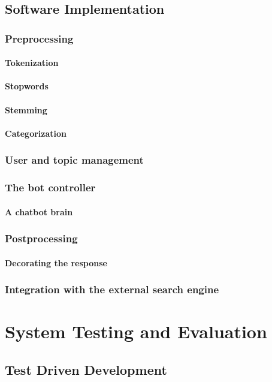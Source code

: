 \documentclass[12pt, twoside, a4paper, draft]{report}
\begin{document}
\section{Software Implementation}
\subsection{Preprocessing}
\subsubsection{Tokenization}
\subsubsection{Stopwords}
\subsubsection{Stemming}
\subsubsection{Categorization}
\subsection{User and topic management}
\subsection{The bot controller}
\subsubsection{A chatbot brain}
\subsection{Postprocessing}
\subsubsection{Decorating the response}
\subsection{Integration with the external search engine}

\chapter{System Testing and Evaluation}
\section{Test Driven Development}
\end{document}
